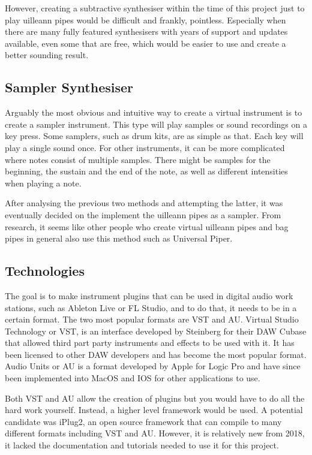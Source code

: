 \documentclass[12pt]{article}
\begin{document}
	However, creating a subtractive synthesiser within the time of this project just to play uilleann pipes would be difficult and
	frankly, pointless. Especially when there are many fully featured synthesisers with years of support and updates available, 
	even some that are free, which would be easier to use and create a better sounding result.
	
	\subsection{Sampler Synthesiser}
	Arguably the most obvious and intuitive way to create a virtual instrument is to create a sampler instrument. This type will
	play samples or sound recordings on a key press. Some samplers, such as drum kits, are as simple as that. Each key will play
	a single sound once. For other instruments, it can be more complicated where notes consist of multiple samples. There
	might be samples for the beginning, the sustain and the end of the note, as well as different intensities when playing a note.
	
	After analysing the previous two methods and attempting the latter, it was eventually decided on the implement the
	uilleann pipes as a sampler. From research, it seems like other people who create virtual uilleann pipes and bag pipes in
	general also use this method such as Universal Piper.
	
	
	\subsection{Technologies}
	The goal is to make instrument plugins that can be used in digital audio work stations, such as Ableton Live or FL Studio,
	and to do that, it needs to be in a certain format. The two most popular formats are VST and AU. Virtual Studio Technology or
	VST, is an interface developed by Steinberg for their DAW Cubase that allowed third part party instruments and effects to be 
	used with it. It has been licensed to other DAW developers and has become the most popular format. 
	Audio Units or AU is a format developed by Apple for Logic Pro and have since been implemented into MacOS and IOS for 
	other applications to use. 
	
	Both VST and AU allow the creation of plugins but you would have to do all the hard work yourself. Instead, a higher level
	framework would be used. A potential candidate was iPlug2, an open source framework that can compile to many different 
	formats including VST and AU. However, it is relatively new from 2018, it lacked the documentation and tutorials needed
	to use it for this project.
	
\end{document}
